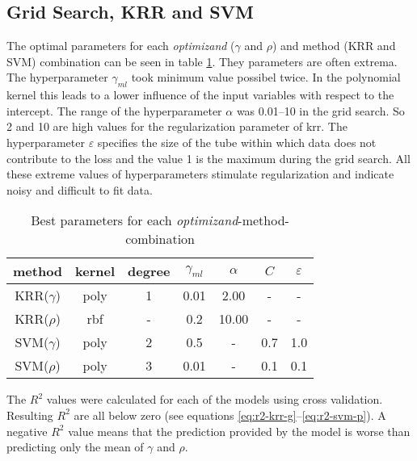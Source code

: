 %


\subsection{Grid Search, KRR and SVM}
The optimal parameters for each \textit{optimizand} ($\gamma$ and $\rho$) and method (KRR and SVM) 
combination can be seen in table \ref{tab:grid-search}. 
They parameters are often extrema.
The hyperparameter $\gamma_{ml}$ took minimum value possibel twice. 
In the polynomial kernel this leads to a lower influence of the input variables with respect to the intercept. 
The range of the hyperparameter $\alpha$ was 0.01--10 in the grid search. 
So 2 and 10 are high values for the regularization parameter of \gls{krr}.
The hyperparameter $\varepsilon$ specifies the size of the tube within which data does not contribute to the loss 
and the value 1 is the maximum during the grid search. 
All these extreme values of hyperparameters stimulate regularization and indicate noisy and difficult to fit data.
\begin{table}
    \center
    \begin{tabular}{ccccccc}
        \hline\hline
        method  &kernel &degree &$\gamma_{ml}$   &$\alpha$    &$C$    &$\varepsilon$\\
        \hline
        KRR($\gamma$)   &poly   &1  &0.01   &2.00 &-&-\\
        KRR($\rho  $)   &rbf    &-   &0.2    &10.00&-&-\\
        SVM($\gamma$)   &poly   &2  &0.5    &-&0.7  &1.0  \\
        SVM($\rho  $)   &poly   &3  &0.01   &-&0.1  &0.1  \\
        \hline\hline
    \end{tabular}
    \caption{Best parameters for each \textit{optimizand}-method-combination}
    \label{tab:grid-search}
\end{table}
The $R^2$ values were calculated for each of the models using cross validation. 
Resulting $R^2$ are all below zero (see equations \ref{eq:r2-krr-g}--\ref{eq:r2-svm-p}). 
A negative $R^2$ value means that the prediction provided by the model is worse than predicting only the mean of $\gamma$ and $\rho$. 

